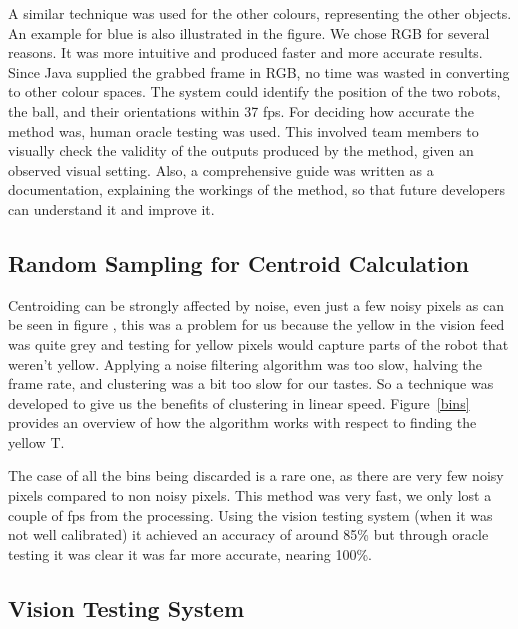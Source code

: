 A similar technique was used for the other colours, representing the other objects. An example for blue is also illustrated in the figure. We chose RGB for several reasons. It was more intuitive and produced faster and more accurate results. Since Java supplied the grabbed frame in RGB, no time was wasted in converting to other colour spaces. The system could identify the position of the two robots, the ball, and their orientations within 37 fps. For deciding how accurate the method was, human oracle testing was used. This involved team members to visually check the validity of the outputs produced by the method, given an observed visual setting. Also, a comprehensive guide was written as a documentation, explaining the workings of the method, so that future developers can understand it and improve it. 

\subsection{Random Sampling for Centroid Calculation}

Centroiding can be strongly affected by noise, even just a few noisy pixels as can be seen in figure \cite{vis1}, this was a problem for us because the yellow in the vision feed was quite grey and testing for yellow pixels would capture parts of the robot that weren't yellow.  Applying a noise filtering algorithm was too slow, halving the frame rate, and clustering was a bit too slow for our tastes.  So a technique was developed to give us the benefits of clustering in linear speed.  Figure~\ref{bins} provides an overview of how the algorithm works with respect to finding the yellow T.

The case of all the bins being discarded is a rare one, as there are very few noisy pixels compared to non noisy pixels.  This method was very fast, we only lost a couple of fps from the processing.  Using the vision testing system (when it was not well calibrated) it achieved an accuracy of around 85\% but through oracle testing it was clear it was far more accurate, nearing 100\%.

\subsection{Vision Testing System}

